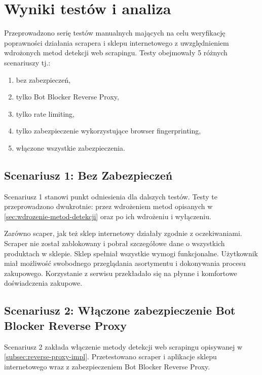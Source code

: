 \newpage


\section{Wyniki testów i analiza}\label{sec:testy}

Przeprowadzono serię testów manualnych mających na celu weryfikację poprawności działania scrapera i sklepu internetowego z uwzględnieniem wdrożonych metod detekcji web scrapingu.
Testy obejmowały 5 różnych scenariuszy tj.:
\begin{enumerate}[label={scenariusz \arabic*:},labelindent=\parindent, leftmargin=*]
    \item bez zabezpieczeń,
    \item tylko Bot Blocker Reverse Proxy,
    \item tylko rate limiting,
    \item tylko zabezpieczenie wykorzystujące browser fingerprinting,
    \item włączone wszystkie zabezpieczenia.
\end{enumerate}

\subsection{Scenariusz 1: Bez Zabezpieczeń}\label{subsec:scenariusz-1:-wyaczone-zabezpieczenia}

Scenariusz 1 stanowi punkt odniesienia dla dalszych testów.
Testy te przeprowadzono dwukrotnie:
przez wdrożeniem metod opisanych w \autoref{sec:wdrozenie-metod-detekcji}
oraz po ich wdrożeniu i wyłączeniu.

Zarówno scaper, jak też sklep internetowy działały zgodnie z oczekiwaniami.
Scraper nie został zablokowany i pobrał szczegółowe dane o wszystkich produktach w sklepie.
Sklep spełniał wszystkie wymogi funkcjonalne.
Użytkownik miał możliwość swobodnego przeglądania asortymentu i dokonywania procesu zakupowego.
Korzystanie z serwisu przekładało się na płynne i komfortowe doświadczenia zakupowe.

\subsection{Scenariusz 2: Włączone zabezpieczenie Bot Blocker Reverse Proxy}\label{subsec:scenariusz-3:-waczone-zabezpieczenie-reverse-proxy-bot-blocker}

Scenariusz 2 zakłada włączenie metody detekcji web scrapingu opisywanej w \autoref{subsec:reverse-proxy-impl}.
Przetestowano scraper i aplikacje sklepu internetowego wraz z zabezpieczeniem Bot Blocker Reverse Proxy.

